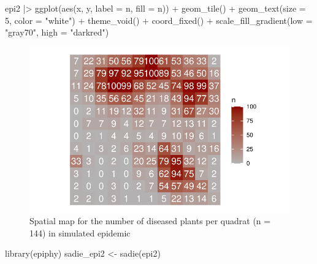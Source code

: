 \documentclass[
  letterpaper,
  DIV=11,
  numbers=noendperiod]{scrreprt}
\newenvironment{Shaded}{\begin{snugshade}}{\end{snugshade}}
\newcommand{\AttributeTok}[1]{\textcolor[rgb]{0.40,0.45,0.13}{#1}}
\newcommand{\DecValTok}[1]{\textcolor[rgb]{0.68,0.00,0.00}{#1}}
\newcommand{\FunctionTok}[1]{\textcolor[rgb]{0.28,0.35,0.67}{#1}}
\newcommand{\NormalTok}[1]{\textcolor[rgb]{0.00,0.23,0.31}{#1}}
\newcommand{\OtherTok}[1]{\textcolor[rgb]{0.00,0.23,0.31}{#1}}
\newcommand{\SpecialCharTok}[1]{\textcolor[rgb]{0.37,0.37,0.37}{#1}}
\newcommand{\StringTok}[1]{\textcolor[rgb]{0.13,0.47,0.30}{#1}}
\begin{document}
\begin{Shaded}
\begin{Highlighting}[]
\NormalTok{epi2 }\SpecialCharTok{|\textgreater{}}
  \FunctionTok{ggplot}\NormalTok{(}\FunctionTok{aes}\NormalTok{(x, y, }\AttributeTok{label =}\NormalTok{ n, }\AttributeTok{fill =}\NormalTok{ n)) }\SpecialCharTok{+}
  \FunctionTok{geom\_tile}\NormalTok{() }\SpecialCharTok{+}
  \FunctionTok{geom\_text}\NormalTok{(}\AttributeTok{size =} \DecValTok{5}\NormalTok{, }\AttributeTok{color =} \StringTok{"white"}\NormalTok{) }\SpecialCharTok{+}
  \FunctionTok{theme\_void}\NormalTok{() }\SpecialCharTok{+}
  \FunctionTok{coord\_fixed}\NormalTok{() }\SpecialCharTok{+}
  \FunctionTok{scale\_fill\_gradient}\NormalTok{(}\AttributeTok{low =} \StringTok{"gray70"}\NormalTok{, }\AttributeTok{high =} \StringTok{"darkred"}\NormalTok{)}
\end{Highlighting}
\end{Shaded}

\begin{figure}[H]

{\centering \includegraphics{spatial-tests_files/figure-pdf/fig-mapgrouped-1.pdf}

}

\caption{\label{fig-mapgrouped}Spatial map for the number of diseased
plants per quadrat (n = 144) in simulated epidemic}

\end{figure}

\begin{Shaded}
\begin{Highlighting}[]
\FunctionTok{library}\NormalTok{(epiphy)}
\NormalTok{sadie\_epi2 }\OtherTok{\textless{}{-}} \FunctionTok{sadie}\NormalTok{(epi2)}
\end{Highlighting}
\end{Shaded}
\end{document}
